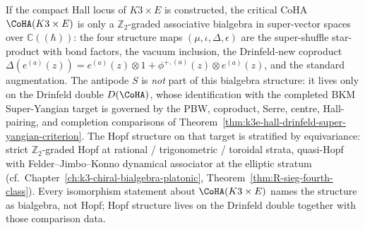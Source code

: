 \begin{remark}
\label{rem:k3e-coha-bialgebra-not-hopf}
If the compact Hall locus of $K3 \times E$ is constructed, the critical
CoHA $\CoHA(K3 \times E)$ is only a $\mathbb{Z}_2$-graded associative
bialgebra in super-vector spaces over $\mathbb{C}((\hbar))$: the four
structure maps $(\mu, \iota, \Delta, \epsilon)$ are the super-shuffle
star-product with bond factors, the vacuum inclusion, the
Drinfeld-new coproduct
\(\Delta(e^{(a)}(z)) = e^{(a)}(z) \otimes 1 +
\phi^{+,(a)}(z) \otimes e^{(a)}(z)\), and the standard augmentation.
The antipode $S$ is \emph{not} part of this bialgebra structure: it
lives only on the Drinfeld double $D(\CoHA)$, whose identification with
the completed BKM Super-Yangian target is governed by the PBW,
coproduct, Serre, centre, Hall-pairing, and completion comparisons of
Theorem~\ref{thm:k3e-hall-drinfeld-super-yangian-criterion}. The
Hopf structure on that target is stratified by equivariance: strict
$\mathbb{Z}_2$-graded Hopf at rational / trigonometric / toroidal
strata, quasi-Hopf with Felder--Jimbo--Konno dynamical associator at
the elliptic stratum (cf.\ Chapter~\ref{ch:k3-chiral-bialgebra-platonic},
Theorem~\ref{thm:R-sieg-fourth-class}). Every isomorphism statement
about $\CoHA(K3 \times E)$ names the structure as bialgebra, not Hopf;
Hopf structure lives on the Drinfeld double together with those
comparison data.
\end{remark}

